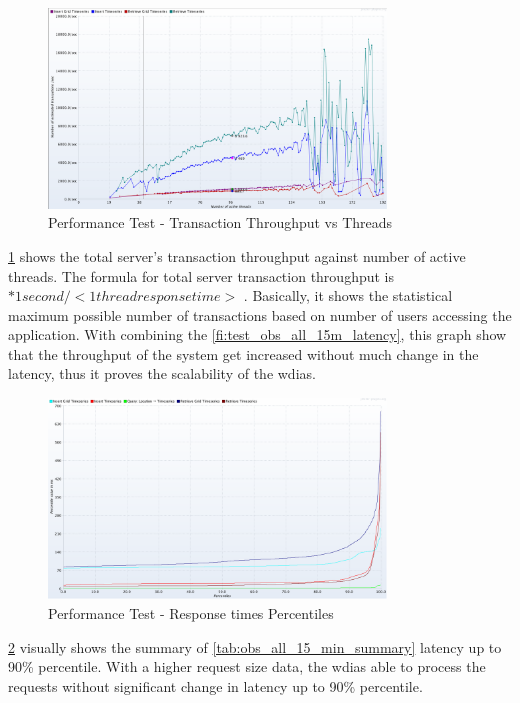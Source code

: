 \begin{figure}[htp]
    \centering
    \includegraphics[width=0.8\textwidth]{results/obs/all/obs_all_15m_transaction_throughtput_vs_threads.png}
    \caption{Performance Test - Transaction Throughput vs Threads}
    \label{fi:test_obs_all_15m_throughtput}
\end{figure}
\ref{fi:test_obs_all_15m_throughtput} shows the total server's transaction throughput against number of active threads.
The formula for total server transaction throughput is \(<active threads> * 1 second / <1  thread response time>\) \cite{JMeterPluginsTransactionPlugin}. Basically, it shows the statistical maximum possible number of transactions based on number of users accessing the application.
With combining the \ref{fi:test_obs_all_15m_latency}, this graph show that the throughput of the system get increased without much change in the latency, thus it proves the scalability of the \acrshort{wdias}.

\begin{figure}[htp]
    \centering
    \includegraphics[width=0.8\textwidth]{results/obs/all/obs_all_15m_response_times_percentiles.png}
    \caption{Performance Test - Response times Percentiles}
    \label{fi:test_obs_all_15m_latency_percentile}
\end{figure}
\ref{fi:test_obs_all_15m_latency_percentile} visually shows the summary of \ref{tab:obs_all_15_min_summary} latency up to 90\% percentile. With a higher request size data, the \acrshort{wdias} able to process the requests without significant change in latency up to 90\% percentile.



